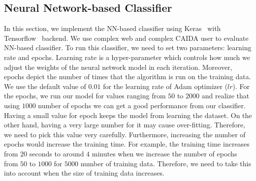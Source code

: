 \subsection{Neural Network-based Classifier}

In this section, we implement the NN-based classifier using Keras~\cite{keras} with Tensorflow~\cite{tensorflow2015-whitepaper} backend. We use complex web and complex CAIDA user to evaluate NN-based classifier. To run this classifier, we need to set two parameters: learning rate and epochs. Learning rate is a hyper-parameter which controls how much we adjust the weights of the neural network model in each iteration. Moreover, epochs depict the number of times that the algorithm is run on the training data. We use the default value of $0.01$ for the learning rate of Adam optimizer ($lr$). For the epochs, we run our model for values ranging from $50$ to $2000$ and realize that using $1000$ number of epochs we can get a good performance from our classifier. Having a small value for epoch keeps the model from learning the dataset. On the other hand, having a very large number for it may cause over-fitting. Therefore, we need to pick this value very carefully. Furthermore, increasing the number of epochs would increase the training time. For example, the training time increases from $20$ seconds to around $4$ minutes when we increase the number of epochs from $50$ to $1000$ for $5000$ number of training data. Therefore, we need to take this into account when the size of training data increases.

